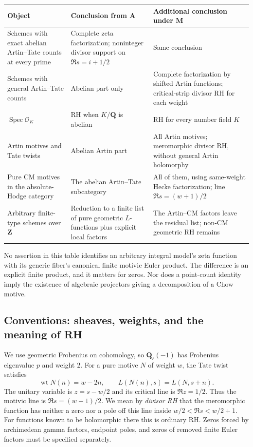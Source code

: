 \documentclass[11pt,a4paper]{article}
\theoremstyle{definition}
\begin{document}
\begin{center}\small
\begin{tabular}{>{\raggedright\arraybackslash}p{.27\linewidth}>{\raggedright\arraybackslash}p{.28\linewidth}>{\raggedright\arraybackslash}p{.35\linewidth}}
\toprule
Object & Conclusion from A & Additional conclusion under M \\
\midrule
Schemes with exact abelian Artin--Tate counts at every prime
& Complete zeta factorization; noninteger divisor support on
$\Re s=i+1/2$ & Same conclusion \\
Schemes with general Artin--Tate counts
& Abelian part only & Complete factorization by shifted Artin functions;
critical-strip divisor RH for each weight \\
$\operatorname{Spec}\mathcal O_K$
& RH when $K/\mathbf Q$ is abelian & RH for every number field $K$ \\
Artin motives and Tate twists
& Abelian Artin part & All Artin motives; meromorphic divisor RH,
without general Artin holomorphy \\
Pure CM motives in the absolute-Hodge category
& The abelian Artin--Tate subcategory & All of them, using same-weight
Hecke factorization; line $\Re s=(w+1)/2$ \\
Arbitrary finite-type schemes over $\mathbf Z$
& Reduction to a finite list of pure geometric $L$-functions plus explicit
local factors & The Artin--CM factors leave the residual list;
non-CM geometric RH remains \\
\bottomrule
\end{tabular}
\end{center}

No assertion in this table identifies an arbitrary integral model's
zeta function with its generic fiber's canonical finite motivic Euler product.
The difference is an explicit finite product, and it matters for zeros.
Nor does a point-count identity imply the existence of algebraic
projectors giving a decomposition of a Chow motive.

\subsection{Conventions: sheaves, weights, and the meaning of RH}
We use geometric Frobenius on cohomology, so $\mathbf Q_\ell(-1)$ has
Frobenius eigenvalue $p$ and weight $2$.  For a pure motive $N$ of weight
$w$, the Tate twist satisfies
\[
 \operatorname{wt}N(n)=w-2n,\qquad L(N(n),s)=L(N,s+n).
\]
The unitary variable is $z=s-w/2$ and its critical line is $\Re z=1/2$.
Thus the motivic line is $\Re s=(w+1)/2$.  We mean by
\emph{divisor RH} that the meromorphic function has neither a zero nor
a pole off this line inside $w/2<\Re s<w/2+1$.
For functions known to be holomorphic there this is ordinary RH.
Zeros forced by archimedean gamma factors, endpoint poles, and zeros
of removed finite Euler factors must be specified separately.
\end{document}
